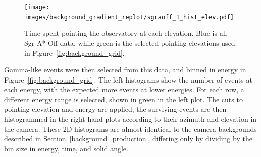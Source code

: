     \begin{figure}[bt]
      \centering
      \texttt{[image: images/background\_gradient\_replot/sgraoff\_1\_hist\_elev.pdf]}
      \caption[Elevation Slice of Sgr A* Off data]{
        Time spent pointing the observatory at each elevation.
        Blue is all Sgr A* Off data, while green is the selected pointing elevations used in Figure~\ref{fig:background_grid}.
      }
      \label{fig:back_elevhist}
    \end{figure}
    
    Gamma-like events were then selected from this data, and binned in energy in Figure~\ref{fig:background_grid}.
    The left histograms show the number of events at each energy, with the expected more events at lower energies.
    For each row, a different energy range is selected, shown in green in the left plot.
    The cuts to pointing-elevation  and energy are applied, the surviving events are then histogrammed in the right-hand plots according to their azimuth and elevation in the camera.
    These 2D histograms are almost identical to the camera backgrounds described in Section~\ref{background_production}, differing only by dividing by the bin size in energy, time, and solid angle.
    
